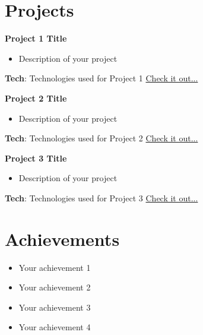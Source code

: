 \documentclass[a4paper,11pt]{article}
\newcommand{\resumeItemListStart}{\begin{itemize}[label={$\bullet$}, leftmargin=*]}
\newcommand{\resumeItemListEnd}{\end{itemize}\vspace{-5pt}}
\begin{document}
\section{\textbf{{\LARGE Projects}}}
\begin{description}[font=$\bullet$]
  \item{\textbf{Project 1 Title}}
  \resumeItemListStart
    \item Description of your project
  \resumeItemListEnd
  \textbf{Tech}: Technologies used for Project 1
  \hfill \textcolor{blue}{\href{https://project1-link}{Check it out...}}
  
  \item{\textbf{Project 2 Title}}
  \resumeItemListStart
    \item Description of your project
  \resumeItemListEnd
  \textbf{Tech}: Technologies used for Project 2
  \hfill \textcolor{blue}{\href{https://project2-link}{Check it out...}}
  
  \item{\textbf{Project 3 Title}}
  \resumeItemListStart
    \item Description of your project
  \resumeItemListEnd
  \textbf{Tech}: Technologies used for Project 3
  \hfill \textcolor{blue}{\href{https://project3-link}{Check it out...}}
\end{description}


\section{\textbf{{\LARGE Achievements}}}
\begin{itemize}[label={$\bullet$}, leftmargin=*]
\item Your achievement 1
\item Your achievement 2
\item Your achievement 3
\item Your achievement 4
\end{itemize}
\end{document}
